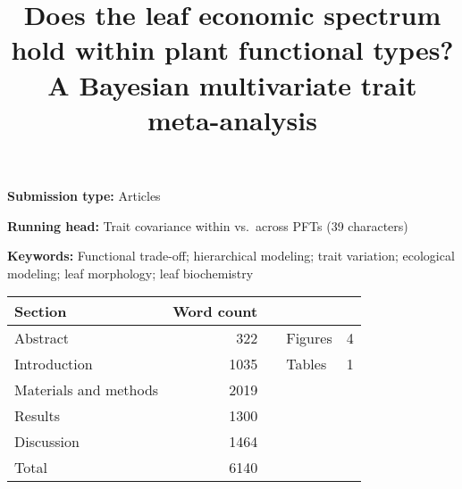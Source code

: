 \documentclass{article}
\title{Does the leaf economic spectrum hold within plant functional types? A Bayesian multivariate trait meta-analysis}
\date{}
\begin{document}
\maketitle

\begin{footnotesize}
\noindent
\textbf{Submission type:} Articles

\noindent
\textbf{Running head:} Trait covariance within vs.\ across PFTs (39 characters)

\noindent
\textbf{Keywords:} Functional trade-off; hierarchical modeling; trait variation; ecological modeling; leaf morphology; leaf biochemistry

\end{footnotesize}

\begin{center}
\footnotesize
\begin{tabular}{lrllr}
Section & Word count &  &  & \\
\midrule
Abstract & 322 &  & Figures & 4\\
Introduction & 1035 &  & Tables & 1\\
Materials and methods & 2019 &  &  & \\
Results & 1300 &  &  & \\
Discussion & 1464 &  &  & \\
\midrule
Total & 6140 &  &  & \\
\end{tabular}
\end{center}

\linenumbers
\doublespacing
\pagebreak
\end{document}
